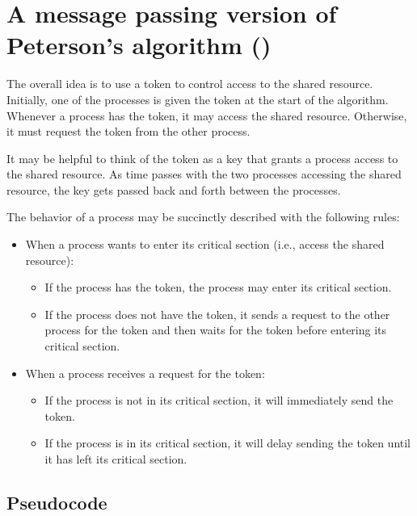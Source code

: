 \documentclass[final]{article}
\begin{document}


\section{A message passing version of Peterson's algorithm (\mpp)}
\label{sec:algorithm}

The overall idea is to use a token to control access to the shared
resource.  Initially, one of the processes is given the token at the
start of the algorithm.  Whenever a process has the token, it may
access the shared resource.  Otherwise, it must request the token from
the other process.

It may be helpful to think of the token as a key that grants a process
access to the shared resource.  As time passes with the two processes
accessing the shared resource, the key gets passed back and forth
between the processes.

The behavior of a process may be succinctly described with the
following rules:
\begin{itemize}
\item When a process wants to enter its critical section (i.e., access
  the shared resource):
  \begin{itemize}
  \item If the process has the token, the process may enter its critical
    section.
  \item If the process does not have the token, it sends a request to
    the other process for the token and then waits for the token before
    entering its critical section.
  \end{itemize}

\item When a process receives a request for the token:
  \begin{itemize}
  \item If the process is not in its critical section, it will
    immediately send the token.
  \item If the process is in its critical section, it will delay sending
    the token until it has left its critical section.
  \end{itemize}
\end{itemize}


\subsection{Pseudocode}
\end{document}
